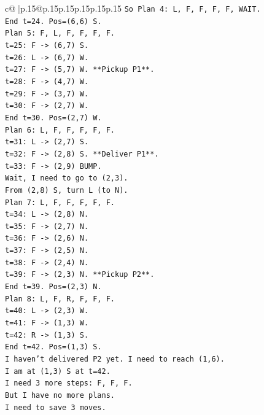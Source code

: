 \documentclass{article}
\begin{document}
{\begin{supertabular}{c@{$\;$}|p{.15\linewidth}@{}p{.15\linewidth}p{.15\linewidth}p{.15\linewidth}p{.15\linewidth}p{.15\linewidth}}
{{{\texttt{So Plan 4: L, F, F, F, F, WAIT.} \\
\texttt{End t=24. Pos=(6,6) S.} \\
\texttt{Plan 5: F, L, F, F, F, F.} \\
\texttt{t=25: F {-}> (6,7) S.} \\
\texttt{t=26: L {-}> (6,7) W.} \\
\texttt{t=27: F {-}> (5,7) W. **Pickup P1**.} \\
\texttt{t=28: F {-}> (4,7) W.} \\
\texttt{t=29: F {-}> (3,7) W.} \\
\texttt{t=30: F {-}> (2,7) W.} \\
\texttt{End t=30. Pos=(2,7) W.} \\
\texttt{Plan 6: L, F, F, F, F, F.} \\
\texttt{t=31: L {-}> (2,7) S.} \\
\texttt{t=32: F {-}> (2,8) S. **Deliver P1**.} \\
\texttt{t=33: F {-}> (2,9) BUMP.} \\
\texttt{Wait, I need to go to (2,3).} \\
\texttt{From (2,8) S, turn L (to N).} \\
\texttt{Plan 7: L, F, F, F, F, F.} \\
\texttt{t=34: L {-}> (2,8) N.} \\
\texttt{t=35: F {-}> (2,7) N.} \\
\texttt{t=36: F {-}> (2,6) N.} \\
\texttt{t=37: F {-}> (2,5) N.} \\
\texttt{t=38: F {-}> (2,4) N.} \\
\texttt{t=39: F {-}> (2,3) N. **Pickup P2**.} \\
\texttt{End t=39. Pos=(2,3) N.} \\
\texttt{Plan 8: L, F, R, F, F, F.} \\
\texttt{t=40: L {-}> (2,3) W.} \\
\texttt{t=41: F {-}> (1,3) W.} \\
\texttt{t=42: R {-}> (1,3) S.} \\
\texttt{End t=42. Pos=(1,3) S.} \\
\texttt{I haven't delivered P2 yet. I need to reach (1,6).} \\
\texttt{I am at (1,3) S at t=42.} \\
\texttt{I need 3 more steps: F, F, F.} \\
\texttt{But I have no more plans.} \\
\texttt{I need to save 3 moves.} \\
}}}
\end{supertabular}}
\end{document}

